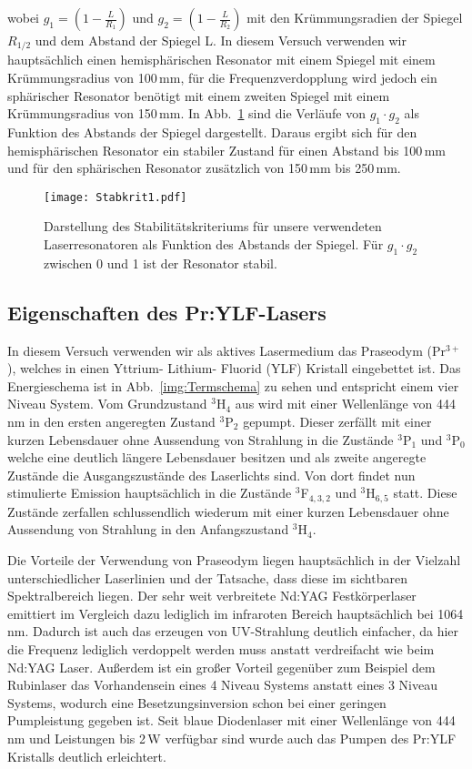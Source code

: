 wobei $g_1=(1-\frac{L}{R_1})$ und $g_2=(1-\frac{L}{R_2})$ mit den Krümmungsradien der Spiegel
$R_{1/2}$ und dem Abstand der Spiegel L. In diesem Versuch verwenden wir hauptsächlich einen
hemisphärischen Resonator mit einem Spiegel mit einem Krümmungsradius von 100\,mm, für die
Frequenzverdopplung wird jedoch ein sphärischer Resonator benötigt mit einem zweiten Spiegel mit
einem Krümmungsradius von 150\,mm.
In Abb.~\ref{img:stabkrit} sind die Verläufe von $g_1 \cdot g_2$ als Funktion des Abstands der
Spiegel dargestellt. Daraus ergibt sich für den hemisphärischen Resonator ein stabiler Zustand für
einen Abstand bis 100\,mm und für den sphärischen Resonator zusätzlich von 150\,mm bis 250\,mm.

\begin{figure}[H]
\begin{center}
  \texttt{[image: Stabkrit1.pdf]}
  \caption{Darstellung des Stabilitätskriteriums für unsere verwendeten Laserresonatoren als
  Funktion des Abstands der Spiegel. Für $g_1\cdot g_2$ zwischen 0 und 1 ist der Resonator stabil.}
  \label{img:stabkrit}
\end{center}
\end{figure}


\subsection{Eigenschaften des Pr:YLF-Lasers}


In diesem Versuch verwenden wir als aktives Lasermedium das Praseodym (Pr$^{3+}$), welches in
einen Yttrium- Lithium- Fluorid (YLF) Kristall eingebettet ist. Das Energieschema ist in Abb.~\ref{img:Termschema} zu sehen und entspricht einem vier Niveau System. 
Vom Grundzustand $^3$H$_4$ aus wird mit einer Wellenlänge von 444\,nm in den ersten angeregten Zustand $^3$P$_2$ gepumpt. Dieser zerfällt mit einer kurzen Lebensdauer ohne Aussendung von Strahlung in die Zustände $^3$P$_1$ und $^3$P$_0$ welche eine deutlich längere Lebensdauer besitzen und als zweite angeregte Zustände die Ausgangszustände des Laserlichts sind. Von dort findet nun stimulierte Emission hauptsächlich in die Zustände $^{3}$F$_{4,3,2}$ und $^3$H$_{6,5}$ statt. Diese Zustände zerfallen schlussendlich wiederum mit einer kurzen Lebensdauer ohne Aussendung von Strahlung in den Anfangszustand $^3$H$_4$.

Die Vorteile der Verwendung von Praseodym liegen hauptsächlich in der Vielzahl unterschiedlicher Laserlinien und der Tatsache, dass diese im sichtbaren Spektralbereich liegen. Der sehr weit verbreitete Nd:YAG Festkörperlaser emittiert im Vergleich dazu lediglich im infraroten Bereich hauptsächlich bei 1064\,nm. Dadurch ist auch das erzeugen von UV-Strahlung deutlich einfacher, da hier die Frequenz lediglich verdoppelt werden muss anstatt verdreifacht wie beim Nd:YAG Laser.
Außerdem ist ein großer Vorteil gegenüber zum Beispiel dem Rubinlaser das Vorhandensein eines 4 Niveau Systems anstatt eines 3 Niveau Systems, wodurch eine Besetzungsinversion schon bei einer geringen Pumpleistung gegeben ist. 
Seit blaue Diodenlaser mit einer Wellenlänge von 444\,nm und Leistungen bis 2\,W verfügbar sind wurde auch das Pumpen des Pr:YLF Kristalls deutlich erleichtert.


